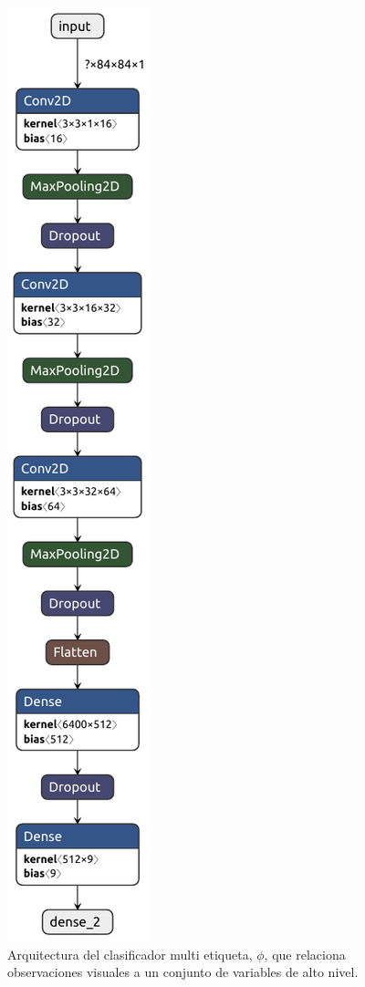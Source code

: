 \begin{figure}[h]
    \includegraphics[scale=0.7]{Chapter5/Figs/multilabel_classifier.pdf}
    \caption{Arquitectura del clasificador multi etiqueta, $\phi$, que
    relaciona observaciones visuales a un conjunto de variables
    de alto nivel.}
    \label{fig:cnn-classifier}
\end{figure}

